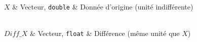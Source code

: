 \begin{tabarg}
\\
\hline
$X$ & Vecteur, \texttt{double} & Donn\'ee d'origine (unit\'e indiff\'erente)\\
\end{tabarg}

\medskip
\begin{tabarg}
\\
\hline
$Diff\_X$ & Vecteur, \texttt{float} & Diff\'erence (m\^eme unit\'e que $X$)\\
\end{tabarg}

